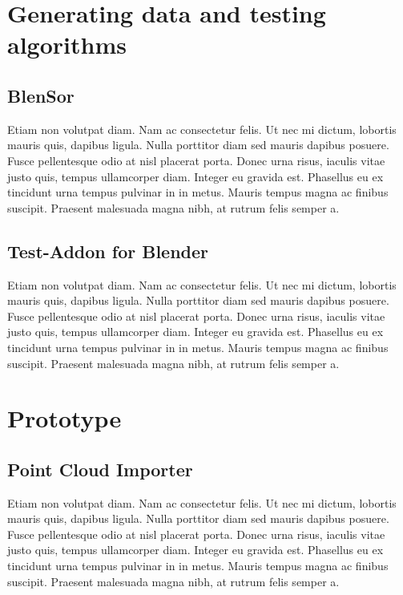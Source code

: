 \section{Generating data and testing algorithms}

\subsection{BlenSor}

Etiam non volutpat diam. Nam ac consectetur felis. Ut nec mi dictum, lobortis mauris quis, dapibus ligula. Nulla porttitor diam sed mauris dapibus posuere. Fusce pellentesque odio at nisl placerat porta. Donec urna risus, iaculis vitae justo quis, tempus ullamcorper diam. Integer eu gravida est. Phasellus eu ex tincidunt urna tempus pulvinar in in metus. Mauris tempus magna ac finibus suscipit. Praesent malesuada magna nibh, at rutrum felis semper a.

\subsection{Test-Addon for Blender}

Etiam non volutpat diam. Nam ac consectetur felis. Ut nec mi dictum, lobortis mauris quis, dapibus ligula. Nulla porttitor diam sed mauris dapibus posuere. Fusce pellentesque odio at nisl placerat porta. Donec urna risus, iaculis vitae justo quis, tempus ullamcorper diam. Integer eu gravida est. Phasellus eu ex tincidunt urna tempus pulvinar in in metus. Mauris tempus magna ac finibus suscipit. Praesent malesuada magna nibh, at rutrum felis semper a.

\section{Prototype}

\subsection{Point Cloud Importer}

Etiam non volutpat diam. Nam ac consectetur felis. Ut nec mi dictum, lobortis mauris quis, dapibus ligula. Nulla porttitor diam sed mauris dapibus posuere. Fusce pellentesque odio at nisl placerat porta. Donec urna risus, iaculis vitae justo quis, tempus ullamcorper diam. Integer eu gravida est. Phasellus eu ex tincidunt urna tempus pulvinar in in metus. Mauris tempus magna ac finibus suscipit. Praesent malesuada magna nibh, at rutrum felis semper a.

